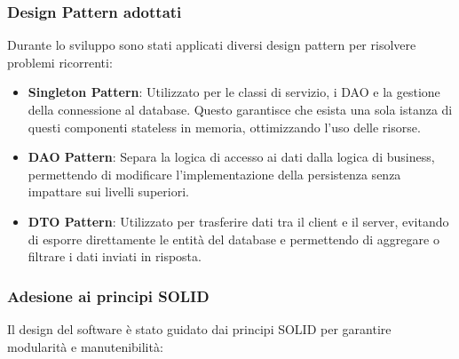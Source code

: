 \subsubsection{Design Pattern adottati}
Durante lo sviluppo sono stati applicati diversi design pattern per risolvere problemi ricorrenti:

\begin{itemize}
    \item \textbf{Singleton Pattern}:
    Utilizzato per le classi di servizio, i DAO e la gestione della connessione al database. 
    Questo garantisce che esista una sola istanza di questi componenti stateless in memoria, ottimizzando l'uso delle risorse.
    
    \item \textbf{DAO Pattern}:
    Separa la logica di accesso ai dati dalla logica di business, permettendo di modificare l'implementazione della persistenza senza impattare sui livelli superiori.
    
    \item \textbf{DTO Pattern}:
    Utilizzato per trasferire dati tra il client e il server, evitando di esporre direttamente le entità del database e permettendo di aggregare o 
    filtrare i dati inviati in risposta.
\end{itemize}

\subsubsection{Adesione ai principi SOLID}
Il design del software è stato guidato dai principi SOLID per garantire modularità e manutenibilità:

